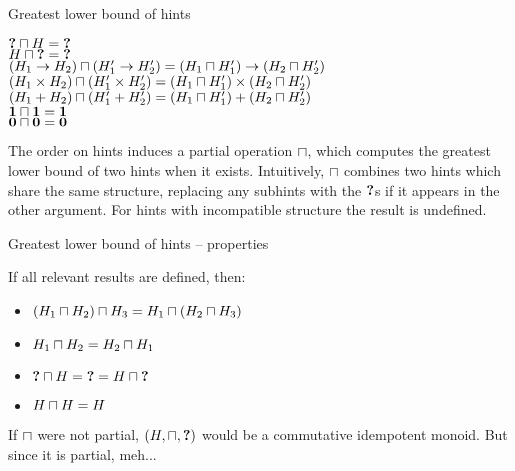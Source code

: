 \documentclass{beamer}
\begin{document}
\begin{frame}{Greatest lower bound of hints}

\begin{center}
  $\textbf{?} \sqcap H = \textbf{?}$ \\
  $H \sqcap \textbf{?} = \textbf{?}$ \\
  $(H_1 \to H_2) \sqcap (H'_1 \to H'_2) = (H_1 \sqcap H'_1) \to (H_2 \sqcap H'_2)$ \\
  $(H_1 \times H_2) \sqcap (H'_1 \times H'_2) = (H_1 \sqcap H'_1) \times (H_2 \sqcap H'_2)$ \\
  $(H_1 + H_2) \sqcap (H'_1 + H'_2) = (H_1 \sqcap H'_1) + (H_2 \sqcap H'_2)$ \\
  $\textbf{1} \sqcap \textbf{1} = \textbf{1}$ \\
  $\textbf{0} \sqcap \textbf{0} = \textbf{0}$
\end{center}

The order on hints induces a partial operation $\sqcap$, which computes the greatest lower bound of two hints when it exists. Intuitively, $\sqcap$ combines two hints which share the same structure, replacing any subhints with the $\textbf{?}$s if it appears in the other argument. For hints with incompatible structure the result is undefined.

\end{frame}

\begin{frame}{Greatest lower bound of hints -- properties}

If all relevant results are defined, then:

\begin{itemize}
  \item $(H_1 \sqcap H_2) \sqcap H_3 = H_1 \sqcap (H_2 \sqcap H_3)$
  \item $H_1 \sqcap H_2 = H_2 \sqcap H_1$
  \item $\textbf{?} \sqcap H = \textbf{?} = H \sqcap \textbf{?}$
  \item $H \sqcap H = H$
\end{itemize}

\vspace{2em}

If $\sqcap$ were not partial, $(H, \sqcap, \textbf{?})$ would be a commutative idempotent monoid. But since it is partial, meh...

\end{frame}
\end{document}
